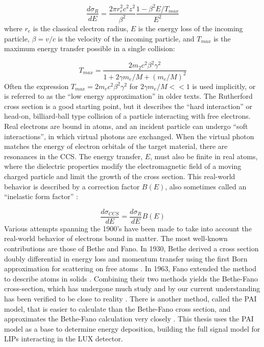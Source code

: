 \begin{equation}
\label{ruth}
\frac{d\sigma_{R}}{dE} = \frac{2\pi r_{e}^{2} c^{2} z^{2}}{\beta^{2}} \frac{1-\beta^{2} E/ T_{max}}{E^{2}}
\end{equation}
where $r_{e}$ is the classical electron radius, $E$ is the energy loss of the incoming particle, $\beta = v/c$ is the velocity of the incoming particle, and $T_{max}$ is the maximum energy transfer possible in a single collision:

\begin{equation}
\label{Tmax}
T_{max} = \frac{ 2m_{2}c^{2} \beta^{2} \gamma^{2}}{1 + 2\gamma m_{e} / M + (m_{e}/M)^{2}}
\end{equation}
Often the expression $T_{max} = 2m_{e}c^{2} \beta^{2}\gamma^{2}$ for $2\gamma m_{e} / M<< 1$ is used implicitly, or is referred to as the ``low energy approximation'' in older texts. The Rutherford cross section is a good starting point, but it describes the ``hard interaction'' or head-on, billiard-ball type collision of a particle interacting with free electrons. Real electrons are bound in atoms, and an incident particle can undergo ``soft interactions'', in which virtual photons are exchanged. When the virtual photon matches the energy of electron orbitals of the target material, there are resonances in the \ac{CCS}. The energy transfer, $E$, must also be finite in real atoms, where the dielectric properties modify the electromagnetic field of a moving charged particle and limit the growth of the cross section. This real-world behavior is described by a correction factor $B(E)$, also sometimes called an ``inelastic form factor'' \cite{PDG}:

\begin{equation}
\label{totalccs}
\frac{d\sigma_{CCS}}{dE} = \frac{d\sigma_{R}}{dE} B(E)
\end{equation}
Various attempts spanning the 1900's have been made to take into account the real-world behavior of electrons bound in matter. The most well-known contributions are those of Bethe and Fano. In 1930, Bethe derived a cross section doubly differential in energy loss and momentum transfer using the first Born approximation for scattering on free atoms \cite{Bethe:1930}. In 1963, Fano extended the method to describe atoms in solids \cite{Fano:1963}. Combining their two methods yields the Bethe-Fano cross-section, which has undergone much study and by our current understanding has been verified to be close to reality \cite{Bichsel:2006}. There is another method, called the \ac{PAI} model, that is easier to calculate than the Bethe-Fano cross section, and approximates the Bethe-Fano calculation very closely \cite{Bichsel:2006}. This thesis uses the \ac{PAI} model as a base to determine energy deposition, building the full signal model for \ac{LIP}s interacting in the \ac{LUX} detector. 

